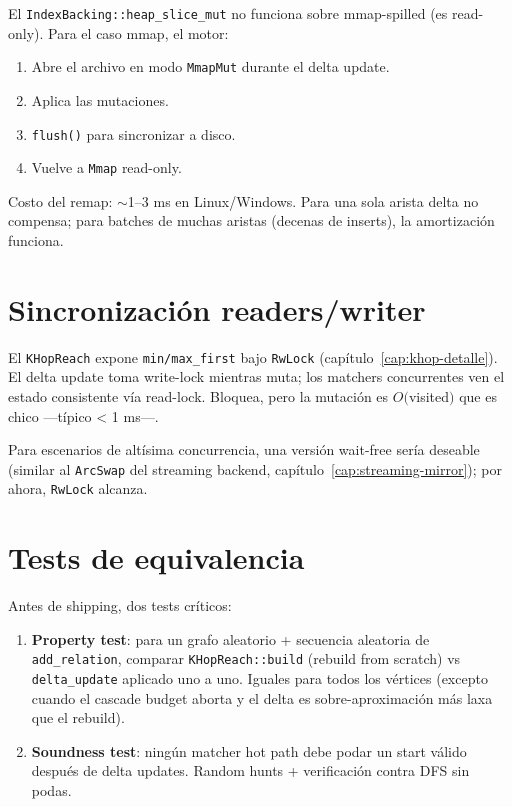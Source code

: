 El \texttt{IndexBacking::heap\_slice\_mut} no funciona sobre
mmap-spilled (es read-only). Para el caso mmap, el motor:

\begin{enumerate}
    \item Abre el archivo en modo \texttt{MmapMut} durante el
    delta update.
    \item Aplica las mutaciones.
    \item \texttt{flush()} para sincronizar a disco.
    \item Vuelve a \texttt{Mmap} read-only.
\end{enumerate}

\noindent
Costo del remap: $\sim$1--3 ms en Linux/Windows. Para una sola
arista delta no compensa; para batches de muchas aristas (decenas
de inserts), la amortización funciona.

\section{Sincronización readers/writer}

El \texttt{KHopReach} expone \texttt{min/max\_first} bajo
\texttt{RwLock} (capítulo~\ref{cap:khop-detalle}). El delta update
toma write-lock mientras muta; los matchers concurrentes ven el
estado consistente vía read-lock. Bloquea, pero la mutación es
\(O(\)visited\()\) que es chico ---típico < 1 ms---.

Para escenarios de altísima concurrencia, una versión wait-free
sería deseable (similar al \texttt{ArcSwap} del streaming backend,
capítulo~\ref{cap:streaming-mirror}); por ahora, \texttt{RwLock}
alcanza.

\section{Tests de equivalencia}

Antes de shipping, dos tests críticos:

\begin{enumerate}
    \item \textbf{Property test}: para un grafo aleatorio + secuencia
    aleatoria de \texttt{add\_relation}, comparar
    \texttt{KHopReach::build} (rebuild from scratch) vs
    \texttt{delta\_update} aplicado uno a uno. Iguales para todos los
    vértices (excepto cuando el cascade budget aborta y el delta es
    sobre-aproximación más laxa que el rebuild).
    \item \textbf{Soundness test}: ningún matcher hot path debe
    podar un start válido después de delta updates. Random hunts
    + verificación contra DFS sin podas.
\end{enumerate}

